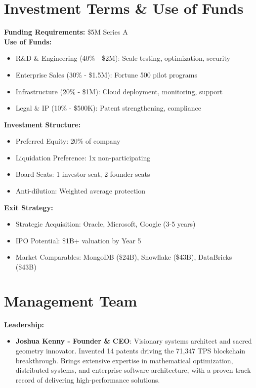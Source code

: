 \documentclass{article}
\begin{document}
\section{Investment Terms \& Use of Funds}
\textbf{Funding Requirements:} \$5M Series A \\
\textbf{Use of Funds:}
\begin{itemize}
    \item R\&D \& Engineering (40\% - \$2M): Scale testing, optimization, security
    \item Enterprise Sales (30\% - \$1.5M): Fortune 500 pilot programs
    \item Infrastructure (20\% - \$1M): Cloud deployment, monitoring, support
    \item Legal \& IP (10\% - \$500K): Patent strengthening, compliance
\end{itemize}

\textbf{Investment Structure:}
\begin{itemize}
    \item Preferred Equity: 20\% of company
    \item Liquidation Preference: 1x non-participating
    \item Board Seats: 1 investor seat, 2 founder seats
    \item Anti-dilution: Weighted average protection
\end{itemize}

\textbf{Exit Strategy:}
\begin{itemize}
    \item Strategic Acquisition: Oracle, Microsoft, Google (3-5 years)
    \item IPO Potential: \$1B+ valuation by Year 5
    \item Market Comparables: MongoDB (\$24B), Snowflake (\$43B), DataBricks (\$43B)
\end{itemize}

\section{Management Team}
\textbf{Leadership:}
\begin{itemize}
    \item \textbf{Joshua Kenny - Founder \& CEO}: Visionary systems architect and sacred geometry innovator. Invented 14 patents driving the 71,347 TPS blockchain breakthrough. Brings extensive expertise in mathematical optimization, distributed systems, and enterprise software architecture, with a proven track record of delivering high-performance solutions.
\end{itemize}
\end{document}

